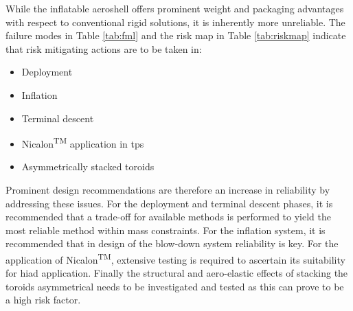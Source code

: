 While the inflatable aeroshell offers prominent weight and packaging advantages with respect to conventional rigid solutions, it is inherently more unreliable. The failure modes in Table \ref{tab:fml} and the risk map in Table \ref{tab:riskmap} indicate that risk mitigating actions are to be taken in:
\begin{itemize}
\item Deployment
\item Inflation
\item Terminal descent
\item Nicalon\textsuperscript{TM} application in \gls{tps}
\item Asymmetrically stacked toroids
\end{itemize}
Prominent design recommendations are therefore an increase in reliability by addressing these issues. For the deployment and terminal descent phases, it is recommended that a trade-off for available methods is performed to yield the most reliable method within mass constraints. For the inflation system, it is recommended that in design of the blow-down system reliability is key. For the application of Nicalon\textsuperscript{TM}, extensive testing is required to ascertain its suitability for \gls{hiad} application. Finally the structural and aero-elastic effects of stacking the toroids asymmetrical needs to be investigated and tested as this can prove to be a high risk factor.